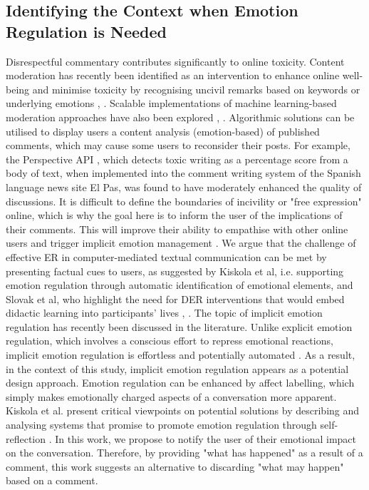 \documentclass[acmtog]{acmart}
\begin{document}
\subsection{Identifying the Context when Emotion Regulation is Needed}
Disrespectful commentary contributes significantly to online toxicity. Content moderation has recently been identified as an intervention to enhance online well-being and minimise toxicity by recognising uncivil remarks based on keywords or underlying emotions \cite{thomas2022s}, \cite{jhaver2021evaluating}. Scalable implementations of machine learning-based moderation approaches have also been explored \cite{gorwa2020algorithmic}, \cite{gillespie2020content}. Algorithmic solutions can be utilised to display users a content analysis (emotion-based) of published comments, which may cause some users to reconsider their posts. For example, the Perspective API \cite{bworld}, which detects toxic writing as a percentage score from a body of text, when implemented into the comment writing system of the Spanish language news site El Pas, was found to have moderately enhanced the quality of discussions. It is difficult to define the boundaries of incivility or "free expression" online, which is why the goal here is to inform the user of the implications of their comments. This will improve their ability to empathise with other online users and trigger implicit emotion management \cite{walther1993impression}. We argue that the challenge of effective ER in computer-mediated textual communication can be met by presenting factual cues to users, as suggested by Kiskola et al, i.e. supporting emotion regulation through automatic identification of emotional elements, and Slovak et al, who highlight the need for DER interventions that would embed didactic learning into participants' lives \cite{kiskola2021applying}, \cite{slovak2022designing}.  The topic of implicit emotion regulation has recently been discussed in the literature. Unlike explicit emotion regulation, which involves a conscious effort to repress emotional reactions, implicit emotion regulation is effortless and potentially automated \cite{torre2018putting}. As a result, in the context of this study, implicit emotion regulation appears as a potential design approach. Emotion regulation can be enhanced by affect labelling, which simply makes emotionally charged aspects of a conversation more apparent. Kiskola et al. present critical viewpoints on potential solutions by describing and analysing systems that promise to promote emotion regulation through self-reflection \cite{kiskola2021applying}. In this work, we propose to notify the user of their emotional impact on the conversation. Therefore, by providing "what has happened" as a result of a comment, this work suggests an alternative to discarding "what may happen" based on a comment.
\end{document}
